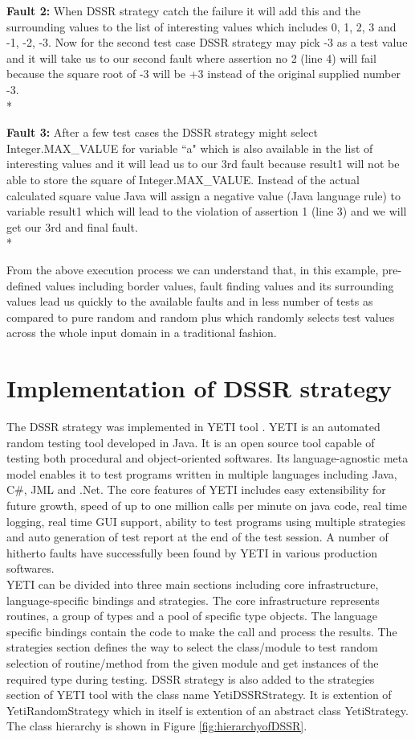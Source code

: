 \textbf{Fault 2:} When DSSR strategy catch the failure it will add this and the surrounding values to the list of interesting values which includes 0, 1, 2, 3 and -1, -2, -3. Now for the second test case DSSR strategy may pick -3 as a test value and it will take us to our second fault where assertion no 2 (line 4) will fail because the square root of -3 will be +3 instead of the original supplied number -3.\\*

\textbf{Fault 3:} After a few test cases the DSSR strategy might select Integer.MAX\_VALUE for variable ``a" which is also available in the list of interesting values and it will lead us to our 3rd fault because result1 will not be able to store the square of Integer.MAX\_VALUE. Instead of the actual calculated square value Java will assign a negative value (Java language rule) to variable result1 which will lead to the violation of assertion 1 (line 3) and we will get our 3rd and final fault.\\*


From the above execution process we can understand that, in this example, pre-defined values including border values, fault finding values and its surrounding values lead us quickly to the available faults and in less number of tests as compared to pure random and random plus which randomly selects test values across the whole input domain in a traditional fashion.

\section{Implementation of DSSR strategy}

The DSSR strategy was implemented in YETI tool \cite{Oriol2011}. YETI is an automated random testing tool developed in Java. It is an open source tool capable of testing both procedural and object-oriented softwares. Its language-agnostic meta model enables it to test programs written in multiple languages including Java, C\#, JML and .Net. The core features of YETI includes easy extensibility for future growth, speed of up to one million calls per minute on java code, real time logging, real time GUI support, ability to test programs using multiple strategies and auto generation of test report at the end of the test session. A number of hitherto faults have successfully been found by YETI in various production softwares. \\

YETI can be divided into three main sections including core infrastructure, language-specific bindings and strategies. The core infrastructure represents routines, a group of types and a pool of specific type objects. The  language specific bindings contain the code to make the call and process the results. The strategies section defines the way to select the class/module to test random selection of routine/method from the given module and get instances of the required type during testing. DSSR strategy is also added to the strategies section of YETI tool with the class name YetiDSSRStrategy. It is extention of YetiRandomStrategy which in itself is extention of an abstract class YetiStrategy. The class hierarchy is shown in Figure \ref{fig:hierarchyofDSSR}.\\

